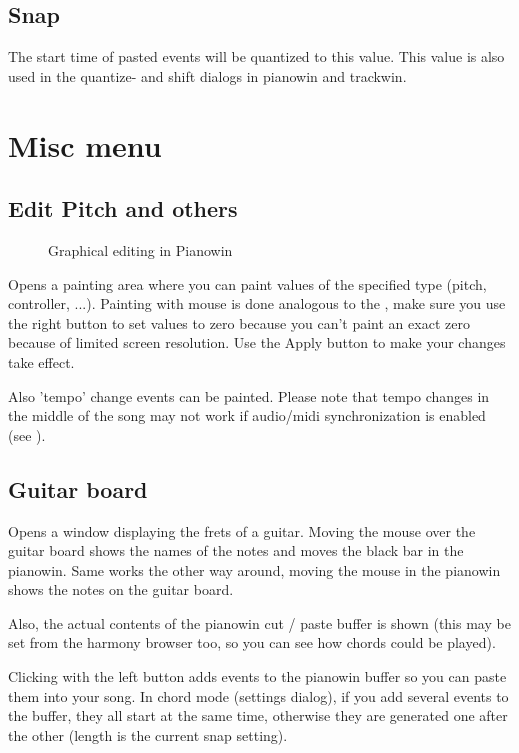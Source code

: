 \documentclass[letterpaper]{report}
\begin{document}
\subsection{Snap}\label{snap}

The start time of pasted events will be quantized to this value. This value is also
used in the quantize- and shift dialogs in pianowin and trackwin.


\section{Misc menu}

\subsection{Edit Pitch and others}

\begin{figure}%
%
%
\caption{Graphical editing in Pianowin}%
\end{figure}


Opens a painting area where you can paint values of the specified type (pitch, controller, ...).
Painting with mouse is done analogous to the , make sure
you use the right button to set values to zero because you can't paint an exact zero because
of limited screen resolution. Use the Apply button to make your changes take effect.

Also 'tempo' change events can be painted. Please note that tempo changes
in the middle of the song may not work if audio/midi synchronization is
enabled (see ).

\subsection{Guitar board}

Opens a window displaying the frets of a guitar. Moving the mouse over the guitar board shows
the names of the notes and moves the black bar in the pianowin. Same works the other way around,
moving the mouse in the pianowin shows the notes on the guitar board.

Also, the actual contents of the pianowin cut / paste buffer is shown (this may be set from the
harmony browser too, so you can see how chords could be played).

Clicking with the left button adds events to the pianowin buffer so you can paste them into
your song. In chord mode (settings dialog), if you add several events to the buffer, they all
start at the same time, otherwise they are generated one after the other (length is the
current snap setting).
\end{document}
